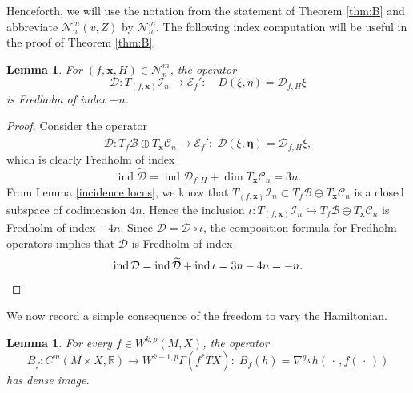 \documentclass[11pt,a4paper]{article}
\newtheorem{lemma}[theorem]{Lemma}
\theoremstyle{definition}
\DeclareMathOperator{\ind}{ind}
\newcommand{\cE}{\mathcal{E}}
\newcommand{\cC}{\mathcal{C}}
\newcommand{\cD}{\mathcal{D}}
\newcommand{\cI}{\mathcal{I}}
\newcommand{\cN}{\mathcal{N}}
\newcommand{\cB}{\mathcal{B}}
\newcommand{\bR}{\mathbb{R}}
\newcommand{\bx}{\mathbf{x}}
\begin{document}
Henceforth, we will use the notation from the statement of Theorem \ref{thm:B} and abbreviate $\cN^m_n (v, Z)$ by $\cN^m_n$. The following index computation will be useful in the proof of Theorem \ref{thm:B}.

\begin{lemma}\label{index computation}
  For $(f, \bx, H) \in \cN^m_n$, the operator  
    \begin{equation*}
      \cD: T_{(f, \bx)} \cI_n \to \cE_{f}': \quad D(\xi, \eta) = \cD_{f, H} \xi
    \end{equation*}
  is Fredholm of index $-n$.
\end{lemma}

\begin{proof}
  Consider the operator
  \begin{equation*}
    \widetilde{\cD}: T_f \cB \oplus T_{\bx} \cC_n \to \cE_{f}': \; \widetilde{\cD}(\xi, \bm{\eta}) = \cD_{f, H} \xi,
  \end{equation*}
  which is clearly Fredholm of index
  \begin{equation*}
    \ind \widetilde{\cD} = \ind \cD_{f, H}  + \dim T_{\bx} \cC_n = 3n.
  \end{equation*}
  From Lemma \ref{incidence locus}, we know that $T_{(f, \bx)}\cI_n \subset T_f \cB \oplus T_{\bx} \cC_n$ is a closed subspace of codimension $4n$. Hence the inclusion $\iota: T_{(f, \bx)}\cI_n \hookrightarrow T_f \cB \oplus T_{\bx} \cC_n$ is Fredholm of index $-4n$. Since $\cD = \widetilde{\cD} \circ \iota$, the composition formula for Fredholm operators \cite[Theorem 4.4.1]{BuehlerSalamon2018} implies that $\cD$ is Fredholm of index
  \begin{equation*}
    \ind \cD = \ind \widetilde{\cD} + \ind \iota = 3n-4n = -n. \qedhere
  \end{equation*}
\end{proof}

We now record a simple consequence of the freedom to vary the Hamiltonian.

\begin{lemma}\label{dense image}
  For every $f \in W^{k, p}(M, X)$, the operator 
  \begin{equation*}
    B_f: C^m(M \times X, \bR) \to W^{k-1, p}\Gamma(f^* TX): \; B_f(h)=\nabla^{g_X} h(\, \cdot \,, f(\, \cdot \,))
  \end{equation*}
  has dense image.
\end{lemma}
\end{document}
